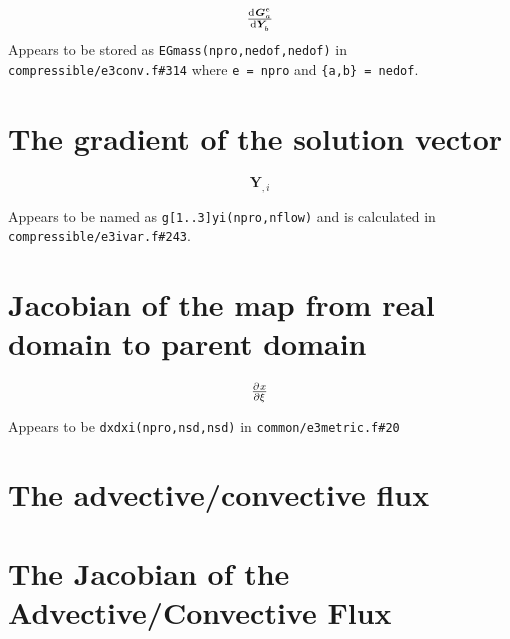 \documentclass[12pt, letterpaper, twoside]{article}
\renewcommand{\vec}[1]{\bm{#1}}
\newcommand{\ttt}[1]{\texttt{#1}}
\newcommand{\Y}{\vec{Y}}
\newcommand{\G}{\vec{G}}
\newcommand{\0}{\vec{0}}
\begin{document}
    \begin{equation}
        \od{\G^e_a}{\Y_b}
    \end{equation}
    Appears to be stored as \ttt{EGmass(npro,nedof,nedof)} in \ttt{compressible/e3conv.f\#314} where \ttt{e = npro} and \ttt{\{a,b\} = nedof}.
\section{The gradient of the solution vector}

    \begin{equation}
        \Y_{,i}
    \end{equation}

    Appears to be named as \ttt{g[1..3]yi(npro,nflow)} and is calculated in \ttt{compressible/e3ivar.f\#243}.


\section{Jacobian of the map from real domain to parent domain}

    \begin{equation}
        \pd{x}{\xi}
    \end{equation}

    Appears to be \ttt{dxdxi(npro,nsd,nsd)} in \ttt{common/e3metric.f\#20}

\section{The advective/convective flux}

\section{The Jacobian of the Advective/Convective Flux}
\end{document}
